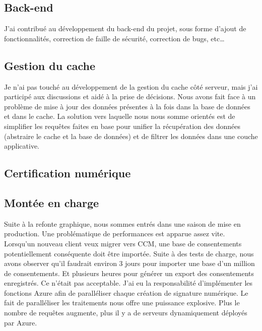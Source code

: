 \documentclass[12pt, a4paper]{report}
\newcommand\tab[1][1cm]{\hspace*{#1}}
\begin{document}
            \subsection{Back-end}
                J'ai contribué au développement du back-end du projet, sous forme d'ajout de fonctionnalités, correction de faille de sécurité, correction de bugs, etc\ldots\newline
            \subsection{Gestion du cache}
                Je n'ai pas touché au développement de la gestion du cache côté serveur, mais j'ai participé aux discussions et aidé à la prise de décisions.
                Nous avons fait face à un problème de mise à jour des données présentes à la fois dans la base de données et dans le cache. La solution vers laquelle nous nous somme orientés est de simplifier les requêtes faites en base pour unifier la récupération des données (abstraire le cache et la base de données) et de filtrer les données dans une couche applicative.
            \subsection{Certification numérique}
            \subsection{Montée en charge}
                \tab{} Suite à la refonte graphique, nous sommes entrés dans une saison de mise en production.\newline
                Une problématique de performances est apparue assez vite. Lorsqu'un nouveau client veux migrer vers CCM, une base de consentements potentiellement conséquente doit être importée. \newline
                Suite à des tests de charge, nous avons observer qu'il faudrait environ 3 jours pour importer une base d'un million de consentements. Et plusieurs heures pour générer un export des consentements enregistrés. Ce n'était pas acceptable.\newline
                J'ai eu la responsabilité d'implémenter les fonctions Azure afin de paralléliser chaque création de signature numérique.
                Le fait de paralléliser les traitements nous offre une puissance explosive. Plus le nombre de requêtes augmente, plus il y a de serveurs dynamiquement déployés par Azure.\newline
\end{document}
